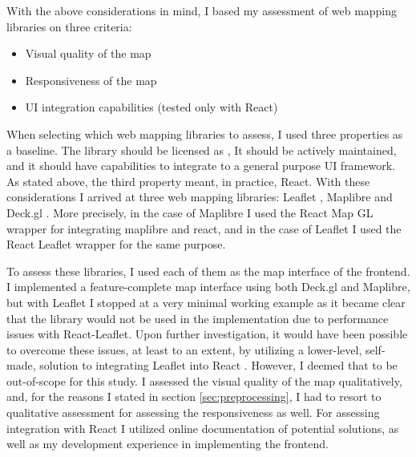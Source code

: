 With the above considerations in mind,
I based my assessment of web mapping libraries on three criteria:
\begin{itemize}
	\item Visual quality of the map
	\item Responsiveness of the map
	\item UI integration capabilities (tested only with React)
\end{itemize}

When selecting which web mapping libraries to assess,
I used three properties as a baseline.
The library should be licensed as ,
It should be actively maintained,
and it should have capabilities to integrate to a general purpose UI framework.
As stated above, the third property meant, in practice, React.
With these considerations I arrived at three web mapping libraries:
Leaflet \parencite{leaflet}, Maplibre \parencite{maplibre} and Deck.gl \parencite{deckgl}.
More precisely, in the case of Maplibre I used the React Map GL wrapper
\parencite{reactmapgl} for integrating maplibre and react, and in the case of Leaflet
I used the React Leaflet wrapper \parencite{reactleaflet} for the same purpose.

To assess these libraries,
I used each of them as the map interface of the frontend. %
I implemented a feature-complete map interface using both
Deck.gl and Maplibre, but with Leaflet I stopped at a very minimal working example
as it became clear that the library would not be used in the implementation due
to performance issues with React-Leaflet.
Upon further investigation, it would have been possible to
overcome these issues, at least to an extent,
by utilizing a lower-level, self-made,
solution to integrating Leaflet into React \parencite{gaj2023}.
However, I deemed that to be out-of-scope for this study.
I assessed the visual quality of the map qualitatively, and,
for the reasons I stated in section \ref{sec:preprocessing},
I had to resort to qualitative assessment
for assessing the responsiveness as well.
For assessing integration with React
I utilized online documentation of potential solutions,
as well as my development experience in implementing the frontend.

